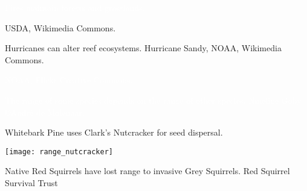 \documentclass[t]{beamer}
\begin{document}

{
\begin{frame}[b]{}

\end{frame}
}

{
\begin{frame}[b]{}

\end{frame}
}

%
{
\begin{frame}[b]{\textcolor{white}{Fires maintain forests and grasslands.}}

\end{frame}
}
%
{
\begin{frame}[b]
	\tiny\hfill USDA, Wikimedia Commons.
\end{frame}
}
%
{
\begin{frame}[b]{Hurricanes can alter reef ecosystems.}
	\tiny\hfill Hurricane Sandy, NOAA, Wikimedia Commons.
\end{frame}
}
%
{
\begin{frame}[b]
	\tiny\textcolor{white}{NOAA, Flickr Creative Commons.}
\end{frame}
}
%
{
\begin{frame}[b]{\textcolor{white}{The range of some species depends on the range of other species.}}
	\tiny\textcolor{white}{Nineline Goby, \copyright André de Molenaar.}
\end{frame}
}
%
\begin{frame}[t]{Whitebark Pine uses Clark’s Nutcracker for seed dispersal.}
	\begin{center}
		\texttt{[image: range\_nutcracker]}
	\end{center}
\end{frame}
%
{
\begin{frame}[b]{Native Red Squirrels have lost range to invasive Grey Squirrels.}	
	\tiny\hfill Red Squirrel Survival Trust
\end{frame}
}
\end{document}
